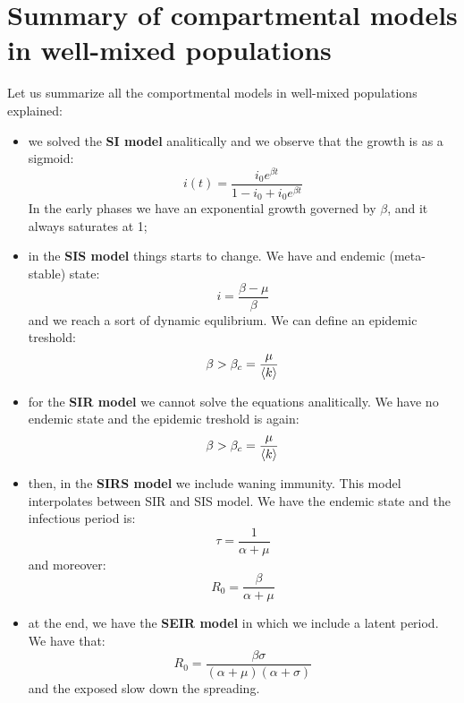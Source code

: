 \documentclass[../main/main.tex]{subfiles}
\begin{document}
\section{Summary of compartmental models in well-mixed populations}
Let us summarize all the comportmental models in well-mixed populations explained:
\begin{itemize}
\item we solved the \textbf{SI model} analitically and we observe that the growth is as a sigmoid:
\begin{equation*}
  i(t) = \frac{i_0 e^{\beta t} }{1-i_0 + i_0 e^{\beta t} }
\end{equation*}
In the early phases we have an exponential growth governed by \( \beta  \), and it always saturates at 1;

\item in the \textbf{SIS model} things starts to change. We have and endemic (meta-stable) state:
\begin{equation*}
  i= \frac{\beta -\mu }{\beta }
\end{equation*}
and we reach a sort of dynamic equlibrium. We can define an epidemic treshold:
\begin{equation*}
  \beta > \beta _c = \frac{\mu }{\expval{k} }
\end{equation*}

\item for the \textbf{SIR model} we cannot solve the equations analitically. We have no endemic state and the epidemic treshold is again:
\begin{equation*}
  \beta > \beta _c = \frac{\mu }{\expval{k} }
\end{equation*}

\item then, in the \textbf{SIRS model} we include waning immunity. This model interpolates between SIR and SIS model. We have the endemic state and the infectious period is:
\begin{equation*}
  \tau = \frac{1}{\alpha + \mu }
\end{equation*}
and moreover:
 \begin{equation*}
   R_0 = \frac{\beta }{\alpha + \mu }
 \end{equation*}

\item at the end, we have the \textbf{SEIR model} in which we include a latent period. We have that:
\begin{equation*}
  R_0 = \frac{\beta \sigma }{(\alpha + \mu )(\alpha +\sigma )}
\end{equation*}
and the exposed slow down the spreading.
\end{itemize}
\end{document}
